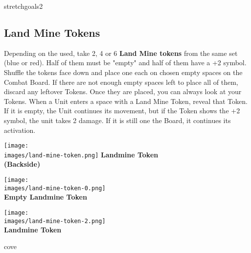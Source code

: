 \begin{multicols}{2}
\vspace*{\fill}
\columnbreak

\begin{expansion}{stretchgoals2}
    \subsection*{Land Mine Tokens}
    Depending on the  used, take 2, 4 or 6 \textbf{Land Mine tokens} from the same set  (blue or red).
    Half of them must be "empty" and half of them have a +2  symbol.
    Shuffle the tokens face down and place one each on chosen empty spaces on the Combat Board.
    If there are not enough empty spaces left to place all of them, discard any leftover Tokens.
    Once they are placed, you can always look at your Tokens.
    When a Unit enters a space with a Land Mine Token, reveal that Token.
    If it is empty, the Unit continues its movement, but if the Token shows the +2  symbol, the unit takes 2 damage.
    If it is still one the Board, it continues its activation.
    \bigskip
    \begin{multicols}{3}
        \centering
        \texttt{[image: \\images/land-mine-token.png]}
        \textbf{\scriptsize\color{darkcandyapplered}Landmine Token\\ (Backside)}

        \columnbreak
        \texttt{[image: \\images/land-mine-token-0.png]}\\
        \textbf{\scriptsize\color{darkcandyapplered}Empty Landmine Token\\}

        \columnbreak
        \texttt{[image: \\images/land-mine-token-2.png]}\\
        \textbf{\scriptsize\color{darkcandyapplered}Landmine Token\\}
    \end{multicols}
\end{expansion}
\columnbreak

\begin{expansion}{cove}

\end{expansion}
\end{multicols}

